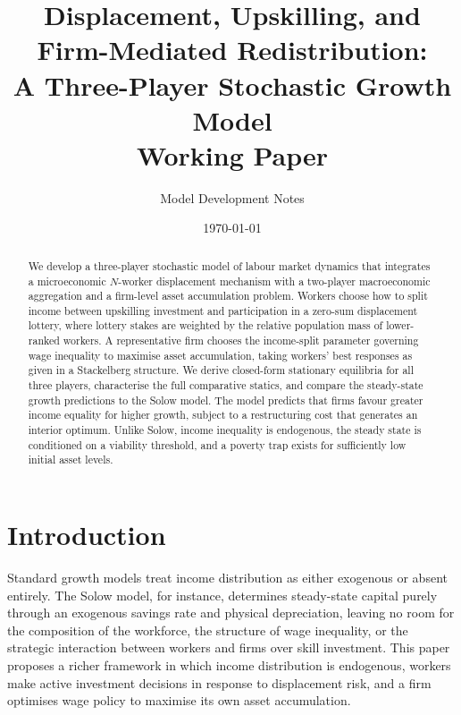 \documentclass[12pt,a4paper]{article}
\title{\textbf{Displacement, Upskilling, and Firm-Mediated Redistribution:\\
A Three-Player Stochastic Growth Model}\\[0.5em]
\large Working Paper}
\author{Model Development Notes}
\date{\today}
\begin{document}
\maketitle

\begin{abstract}
We develop a three-player stochastic model of labour market dynamics that integrates
a microeconomic $N$-worker displacement mechanism with a two-player macroeconomic
aggregation and a firm-level asset accumulation problem. Workers choose how to split
income between upskilling investment and participation in a zero-sum displacement
lottery, where lottery stakes are weighted by the relative population mass of
lower-ranked workers. A representative firm chooses the income-split parameter
governing wage inequality to maximise asset accumulation, taking workers' best
responses as given in a Stackelberg structure. We derive closed-form stationary
equilibria for all three players, characterise the full comparative statics,
and compare the steady-state growth predictions to the Solow model.
The model predicts that firms favour greater income equality for higher growth,
subject to a restructuring cost that generates an interior optimum. Unlike Solow,
income inequality is endogenous, the steady state is conditioned on a viability
threshold, and a poverty trap exists for sufficiently low initial asset levels.
\end{abstract}

\tableofcontents
\newpage

\section{Introduction}

Standard growth models treat income distribution as either exogenous or absent
entirely. The Solow model, for instance, determines steady-state capital purely
through an exogenous savings rate and physical depreciation, leaving no room for
the composition of the workforce, the structure of wage inequality, or the
strategic interaction between workers and firms over skill investment. This paper
proposes a richer framework in which income distribution is endogenous, workers
make active investment decisions in response to displacement risk, and a firm
optimises wage policy to maximise its own asset accumulation.
\end{document}

